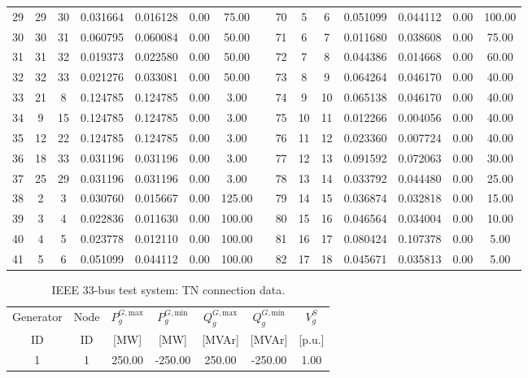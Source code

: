 \documentclass[preprint,12pt]{elsarticle}
\begin{document}
\begin{table}[htbp!]
{\begin{tabular}{ccccccc c ccccccc}
            29 & 29 & 30 & 0.031664 & 0.016128 & 0.00 & 75.00 &  & 70 & 5 & 6 & 0.051099 & 0.044112 & 0.00 & 100.00\\
            30 & 30 & 31 & 0.060795 & 0.060084 & 0.00 & 50.00 &  & 71 & 6 & 7 & 0.011680 & 0.038608 & 0.00 & 75.00\\
            31 & 31 & 32 & 0.019373 & 0.022580 & 0.00 & 50.00 &  & 72 & 7 & 8 & 0.044386 & 0.014668 & 0.00 & 60.00\\
            32 & 32 & 33 & 0.021276 & 0.033081 & 0.00 & 50.00 &  & 73 & 8 & 9 & 0.064264 & 0.046170 & 0.00 & 40.00\\
            33 & 21 & 8 & 0.124785 & 0.124785 & 0.00 & 3.00 &  & 74 & 9 & 10 & 0.065138 & 0.046170 & 0.00 & 40.00\\
            34 & 9 & 15 & 0.124785 & 0.124785 & 0.00 & 3.00 &  & 75 & 10 & 11 & 0.012266 & 0.004056 & 0.00 & 40.00\\
            35 & 12 & 22 & 0.124785 & 0.124785 & 0.00 & 3.00 &  & 76 & 11 & 12 & 0.023360 & 0.007724 & 0.00 & 40.00\\
            36 & 18 & 33 & 0.031196 & 0.031196 & 0.00 & 3.00 &  & 77 & 12 & 13 & 0.091592 & 0.072063 & 0.00 & 30.00\\
            37 & 25 & 29 & 0.031196 & 0.031196 & 0.00 & 3.00 &  & 78 & 13 & 14 & 0.033792 & 0.044480 & 0.00 & 25.00\\
            38 & 2 & 3 & 0.030760 & 0.015667 & 0.00 & 125.00 &  & 79 & 14 & 15 & 0.036874 & 0.032818 & 0.00 & 15.00\\
            39 & 3 & 4 & 0.022836 & 0.011630 & 0.00 & 100.00 &  & 80 & 15 & 16 & 0.046564 & 0.034004 & 0.00 & 10.00\\
            40 & 4 & 5 & 0.023778 & 0.012110 & 0.00 & 100.00 &  & 81 & 16 & 17 & 0.080424 & 0.107378 & 0.00 & 5.00\\
            41 & 5 & 6 & 0.051099 & 0.044112 & 0.00 & 100.00 &  & 82 & 17 & 18 & 0.045671 & 0.035813 & 0.00 & 5.00\\
            \cmidrule{1-7} \cmidrule{9-15}
        \end{tabular}
    }
    \label{tab:cs1_ieee33_branches}
\end{table}

\begin{table}[htbp!]
    \centering
    \caption{IEEE 33-bus test system: TN connection data.}
        \begin{tabular}{ccccccc}
            \toprule
            Generator   & Node  & $P^{G,\text{max}}_{g}$ & $P^{G,\text{min}}_{g}$ & $Q^{G,\text{max}}_{g}$ & $Q^{G,\text{min}}_{g}$ & $V^S_g$ \\ \cmidrule{3-7}
            ID          & ID    & [MW]                   & [MW]                   & [MVAr]                 & [MVAr]                 & [p.u.]\\
            \midrule
            1 & 1 & 250.00 & -250.00 & 250.00 & -250.00 & 1.00\\
            \bottomrule
        \end{tabular}
    \label{tab:cs1_ieee33_generators}
\end{table}
\end{document}
